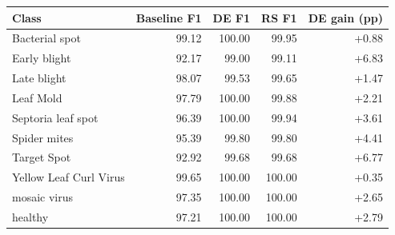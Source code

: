 \begin{tabular}{lrrrr}
\toprule
Class & Baseline F1 & DE F1 & RS F1 & DE gain (pp) \\
\midrule
Bacterial spot & 99.12 & 100.00 & 99.95 & +0.88 \\
Early blight & 92.17 & 99.00 & 99.11 & +6.83 \\
Late blight & 98.07 & 99.53 & 99.65 & +1.47 \\
Leaf Mold & 97.79 & 100.00 & 99.88 & +2.21 \\
Septoria leaf spot & 96.39 & 100.00 & 99.94 & +3.61 \\
Spider mites & 95.39 & 99.80 & 99.80 & +4.41 \\
Target Spot & 92.92 & 99.68 & 99.68 & +6.77 \\
Yellow Leaf Curl Virus & 99.65 & 100.00 & 100.00 & +0.35 \\
mosaic virus & 97.35 & 100.00 & 100.00 & +2.65 \\
healthy & 97.21 & 100.00 & 100.00 & +2.79 \\
\bottomrule
\end{tabular}
